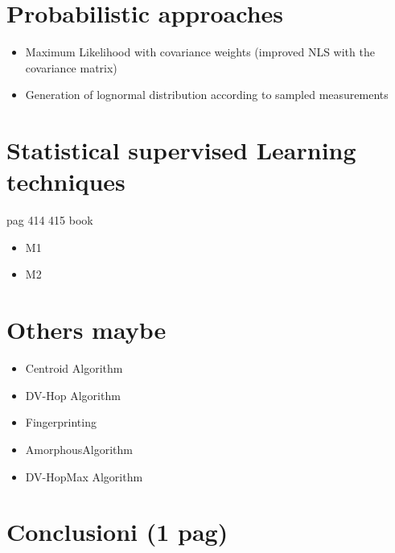 \documentclass[12pt]{article}
\begin{document}
\clearpage

\section{Probabilistic approaches}
\begin{itemize}
    \item Maximum Likelihood with covariance weights (improved NLS with the covariance matrix)
    \item Generation of lognormal distribution according to sampled measurements
\end{itemize}
\clearpage

\section{Statistical supervised Learning techniques} 
pag 414 415 book	
\begin{itemize}
    \item M1
    \item M2
\end{itemize}
\clearpage

\section{Others maybe}
\begin{itemize}
    \item Centroid Algorithm
    \item DV-Hop Algorithm
    \item Fingerprinting
    \item AmorphousAlgorithm
    \item DV-HopMax Algorithm
\end{itemize}

\clearpage





\section{Conclusioni (1 pag)}









\clearpage
\printbibliography[
heading=bibintoc,
title={Whole bibliography}
]

\clearpage

\printbibliography[heading=subbibintoc,type=article,title={Articles only}]
\printbibliography[type=book,title={Books only}]
\printbibliography[keyword={physics},title={Physics-related only}]
\printbibliography[keyword={latex},title={\LaTeX-related only}]
\end{document}
